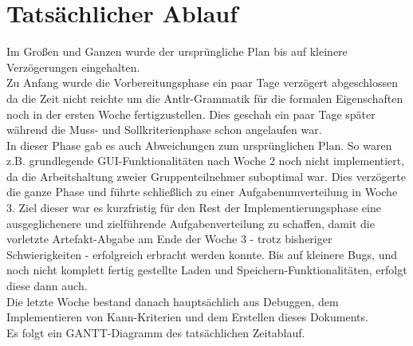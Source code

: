 \documentclass[a4paper]{scrreprt}
\begin{document}
\section{Tatsächlicher Ablauf}
Im Großen und Ganzen wurde der ursprüngliche Plan bis auf kleinere Verzögerungen eingehalten. 
\\Zu Anfang wurde die Vorbereitungsphase ein paar Tage verzögert abgeschlossen da die Zeit nicht reichte um die Antlr-Grammatik für die formalen Eigenschaften noch in der ersten Woche fertigzustellen. Dies geschah ein paar Tage später während die Muss- und Sollkriterienphase schon angelaufen war.\\
In dieser Phase gab es auch Abweichungen zum ursprünglichen Plan. So waren z.B. grundlegende GUI-Funktionalitäten nach Woche 2 noch nicht implementiert, da die Arbeitshaltung zweier Gruppenteilnehmer suboptimal war. Dies verzögerte die ganze Phase und führte schließlich zu einer Aufgabenumverteilung in Woche 3. Ziel dieser war es kurzfristig für den Rest der Implementierungsphase eine ausgeglichenere und zielführende Aufgabenverteilung zu schaffen, damit die vorletzte Artefakt-Abgabe am Ende der Woche 3 - trotz bisheriger Schwierigkeiten - erfolgreich erbracht werden konnte. Bis auf kleinere Bugs, und noch nicht komplett fertig gestellte Laden und Speichern-Funktionalitäten, erfolgt diese dann auch.\\
Die letzte Woche bestand danach hauptsächlich aus Debuggen, dem Implementieren von Kann-Kriterien und dem Erstellen dieses Dokuments.\\
Es folgt ein GANTT-Diagramm des tatsächlichen Zeitablauf.

\begin{figure}[ht]
\end{figure}
\end{document}
